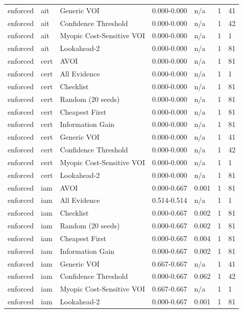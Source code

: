 \begin{table}[!ht]
{\begin{tabular}{lllllll}
enforced & ait & Generic VOI & 0.000-0.000 & n/a & 1 & 41 \\
enforced & ait & Confidence Threshold & 0.000-0.000 & n/a & 1 & 42 \\
enforced & ait & Myopic Cost-Sensitive VOI & 0.000-0.000 & n/a & 1 & 1 \\
enforced & ait & Lookahead-2 & 0.000-0.000 & n/a & 1 & 81 \\
enforced & cert & AVOI & 0.000-0.000 & n/a & 1 & 81 \\
enforced & cert & All Evidence & 0.000-0.000 & n/a & 1 & 1 \\
enforced & cert & Checklist & 0.000-0.000 & n/a & 1 & 81 \\
enforced & cert & Random (20 seeds) & 0.000-0.000 & n/a & 1 & 81 \\
enforced & cert & Cheapest First & 0.000-0.000 & n/a & 1 & 81 \\
enforced & cert & Information Gain & 0.000-0.000 & n/a & 1 & 81 \\
enforced & cert & Generic VOI & 0.000-0.000 & n/a & 1 & 41 \\
enforced & cert & Confidence Threshold & 0.000-0.000 & n/a & 1 & 42 \\
enforced & cert & Myopic Cost-Sensitive VOI & 0.000-0.000 & n/a & 1 & 1 \\
enforced & cert & Lookahead-2 & 0.000-0.000 & n/a & 1 & 81 \\
enforced & iam & AVOI & 0.000-0.667 & 0.001 & 1 & 81 \\
enforced & iam & All Evidence & 0.514-0.514 & n/a & 1 & 1 \\
enforced & iam & Checklist & 0.000-0.667 & 0.002 & 1 & 81 \\
enforced & iam & Random (20 seeds) & 0.000-0.667 & 0.002 & 1 & 81 \\
enforced & iam & Cheapest First & 0.000-0.667 & 0.004 & 1 & 81 \\
enforced & iam & Information Gain & 0.000-0.667 & 0.002 & 1 & 81 \\
enforced & iam & Generic VOI & 0.667-0.667 & n/a & 1 & 41 \\
enforced & iam & Confidence Threshold & 0.000-0.667 & 0.062 & 1 & 42 \\
enforced & iam & Myopic Cost-Sensitive VOI & 0.667-0.667 & n/a & 1 & 1 \\
enforced & iam & Lookahead-2 & 0.000-0.667 & 0.001 & 1 & 81 \\
\bottomrule
\end{tabular}}
\end{table}
